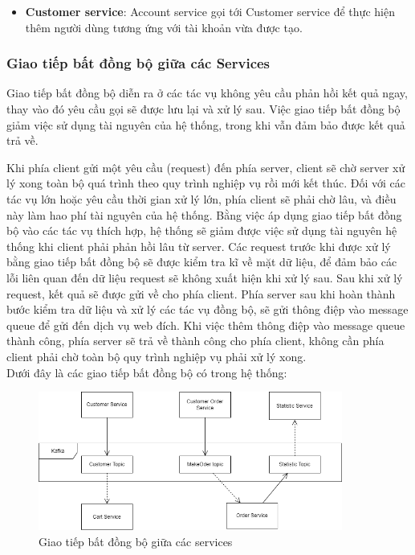 \begin{itemize}
	\item \textbf{Customer service}: Account service gọi tới Customer service để thực hiện thêm người dùng tương ứng với tài khoản vừa được tạo.
\end{itemize}

\subsubsection{Giao tiếp bất đồng bộ giữa các Services}


\hspace*{0.5cm} Giao tiếp bất đồng bộ diễn ra ở các tác vụ không yêu cầu phản hồi kết quả ngay, thay vào đó yêu cầu gọi sẽ được lưu lại và xử lý sau. Việc giao tiếp bất đồng bộ giảm việc sử dụng tài nguyên của hệ thống, trong khi vẫn đảm bảo được kết quả trả về.

\par Khi phía client gửi một yêu cầu (request) đến phía server, client sẽ chờ server xử lý xong toàn bộ quá trình theo quy trình nghiệp vụ rồi mới kết thúc. 
Đối với các tác vụ lớn hoặc yêu cầu thời gian xử lý lớn, phía client sẽ phải chờ lâu, và điều này làm hao phí tài nguyên của hệ thống. Bằng việc áp dụng giao tiếp bất đồng bộ vào các tác vụ thích hợp, hệ thống sẽ giảm được việc sử dụng tài nguyên hệ thống khi client phải phản hồi lâu từ server. 
Các request trước khi được xử lý bằng giao tiếp bất đồng bộ sẽ được kiểm tra kĩ về mặt dữ liệu, để đảm bảo các lỗi liên quan đến dữ liệu request sẽ không xuất hiện khi xử lý sau. Sau khi xử lý request, kết quả sẽ được gửi về cho phía client. 
Phía server sau khi hoàn thành bước kiểm tra dữ liệu và xử lý các tác vụ đồng bộ, sẽ gửi thông điệp vào message queue để gửi đến dịch vụ web đích. Khi việc thêm thông điệp vào message queue thành công, phía server sẽ trả về thành công cho phía client, không cần phía client phải chờ toàn bộ quy trình nghiệp vụ phải xử lý xong.\\

Dưới đây là các giao tiếp bất đồng bộ có trong hệ thống:

\begin{figure}[!htp]
	\centering
	\includegraphics[width=10cm]{img/Architecture/kafka.png}
	\newline
	\caption{Giao tiếp bất đồng bộ giữa các services}
\end{figure}

